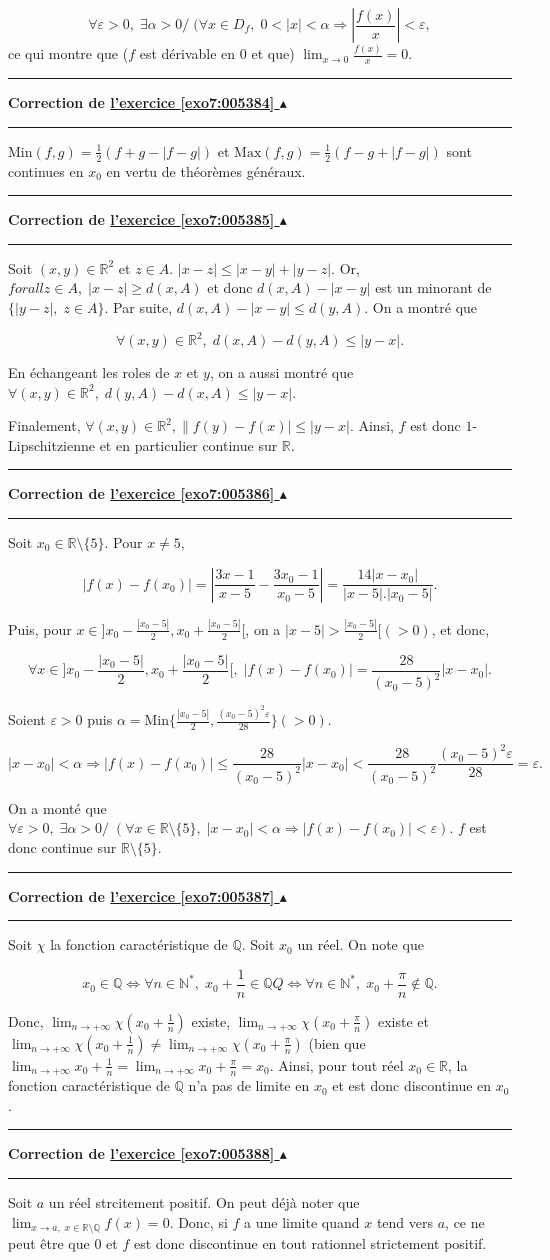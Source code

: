 \documentclass[11pt,a4paper]{article}
\newcommand{\Nn}{\mathbb{N}} \newcommand{\N}{\mathbb{N}}
\newcommand{\Qq}{\mathbb{Q}} \newcommand{\Q}{\mathbb{Q}}
\newcommand{\Rr}{\mathbb{R}} \newcommand{\R}{\mathbb{R}}
\newcounter{exo}
\newcommand{\correction}[1]{\hypertarget{cor7:#1}{}\label{cor7:#1}{\bf Correction de \hyperlink{exo7:#1}{l'exercice \ref{exo7:#1} $\blacktriangle$}}\vspace{1mm}\hrule\vspace{1mm}}
\newcommand{\fincorrection}{\vspace{1mm}\hrule\vspace*{7mm}}
\begin{document}
$$\forall\varepsilon>0,\;\exists\alpha>0/\;(\forall x\in D_f,\;0<|x|<\alpha\Rightarrow\left|\frac{f(x)}{x}\right|<\varepsilon,$$ ce qui montre que ($f$ est dérivable en $0$ et que) $\lim_{x\rightarrow 0}\frac{f(x)}{x}=0$.

\fincorrection
\correction{005384}
$\mbox{Min}(f,g)=\frac{1}{2}(f+g-|f-g|)$ et $\mbox{Max}(f,g)=\frac{1}{2}(f-g+|f-g|)$ sont continues en $x_0$ en vertu de théorèmes généraux.
\fincorrection
\correction{005385}
Soit $(x,y)\in\Rr^2$ et $z\in A$. $|x-z|\leq|x-y|+|y-z|$. Or, $forall z\in A,\;|x-z|\geq d(x,A)$ et donc $d(x,A)-|x-y|$ est un minorant de $\{|y-z|,\;z\in A\}$. Par suite, $d(x,A)-|x-y|\leq d(y,A)$. On a montré que 

$$\forall(x,y)\in\Rr^2,\;d(x,A)-d(y,A)\leq|y-x|.$$

En échangeant les roles de $x$ et $y$, on a aussi montré que $\forall(x,y)\in\Rr^2,\;d(y,A)-d(x,A)\leq|y-x|$.

Finalement, $\forall(x,y)\in\Rr^2,\|f(y)-f(x)|\leq|y-x|$. Ainsi, $f$ est donc $1$-Lipschitzienne et en particulier continue sur $\Rr$.
\fincorrection
\correction{005386}
Soit $x_0\in\Rr\setminus\{5\}$. Pour $x\neq5$, 

$$|f(x)-f(x_0)|=\left|\frac{3x-1}{x-5}-\frac{3x_0-1}{x_0-5}\right|=\frac{14|x-x_0|}{|x-5|.|x_0-5|}.$$

Puis, pour $x\in]x_0-\frac{|x_0-5|}{2},x_0+\frac{|x_0-5|}{2}[$, on a $|x-5|>\frac{|x_0-5|}{2}[(>0)$, et donc,

$$\forall x\in]x_0-\frac{|x_0-5|}{2},x_0+\frac{|x_0-5|}{2}[,\;|f(x)-f(x_0)|=\frac{28}{(x_0-5)^2}|x-x_0|.$$

Soient $\varepsilon>0$ puis $\alpha=\mbox{Min}\{\frac{|x_0-5|}{2},\frac{(x_0-5)^2\varepsilon}{28}\}(>0)$.

$$|x-x_0|<\alpha\Rightarrow|f(x)-f(x_0)|\leq\frac{28}{(x_0-5)^2}|x-x_0|<\frac{28}{(x_0-5)^2}\frac{(x_0-5)^2\varepsilon}{28}=\varepsilon.$$

On a monté que $\forall\varepsilon>0,\;\exists\alpha>0/\;(\forall x\in\Rr\setminus\{5\},\;|x-x_0|<\alpha\Rightarrow|f(x)-f(x_0)|<\varepsilon)$. $f$ est donc continue sur $\Rr\setminus\{5\}$.
\fincorrection
\correction{005387}
Soit $\chi$ la fonction caractéristique de $\Qq$.
Soit $x_0$ un réel. On note que

$$x_0\in\Qq\Leftrightarrow\forall n\in\Nn^*,\;x_0+\frac{1}{n}\in\Qq Q\Leftrightarrow\forall n\in\Nn^*,\;x_0+\frac{\pi}{n}\notin\Qq.$$

Donc, $\lim_{n\rightarrow +\infty}\chi(x_0+\frac{1}{n})$ existe, $\lim_{n\rightarrow +\infty}\chi(x_0+\frac{\pi}{n})$ existe et$\lim_{n\rightarrow +\infty}\chi(x_0+\frac{1}{n})\neq\lim_{n\rightarrow +\infty}\chi(x_0+\frac{\pi}{n})$ (bien que $\lim_{n\rightarrow +\infty}x_0+\frac{1}{n}=\lim_{n\rightarrow +\infty}x_0+\frac{\pi}{n}=x_0$. Ainsi, pour tout réel $x_0\in\Rr$, la fonction caractéristique de $\Qq$ n'a pas de limite en $x_0$ et est donc discontinue en $x_0$.
\fincorrection
\correction{005388}
Soit $a$ un réel strcitement positif. On peut déjà noter que $\lim_{x\rightarrow a,\;x\in\Rr\setminus\Qq}f(x)=0$. Donc, si $f$ a une limite quand $x$ tend vers $a$, ce ne peut être que $0$ et $f$ est donc discontinue en tout rationnel strictement positif.
\end{document}

